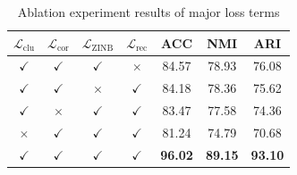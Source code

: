 \begin{table}[t]
\centering


\small
\begin{tabular}{cccc|ccc}
\toprule
\boldmath$\mathcal{L}_{\text{clu}}$ & \boldmath$\mathcal{L}_{\text{cor}}$ & \boldmath$\mathcal{L}_{\text{ZINB}}$ & \boldmath$\mathcal{L}_{\text{rec}}$ & \textbf{ACC} & \textbf{NMI} & \textbf{ARI} \\
\midrule
$\checkmark$ & $\checkmark$ & $\checkmark$ & $\times$      & 84.57 & 78.93 & 76.08 \\
$\checkmark$ & $\checkmark$ & $\times$      & $\checkmark$ & 84.18 & 78.36 & 75.62 \\
$\checkmark$ & $\times$      & $\checkmark$ & $\checkmark$ & 83.47 & 77.58 & 74.36 \\
$\times$      & $\checkmark$ & $\checkmark$ & $\checkmark$ & 81.24 & 74.79 & 70.68 \\
\midrule
$\checkmark$ & $\checkmark$ & $\checkmark$ & $\checkmark$ & \textbf{96.02} & \textbf{89.15} & \textbf{93.10} \\
\bottomrule
\end{tabular}
\caption{Ablation experiment results of major loss terms}
\label{tab:main_ablation}
\end{table}